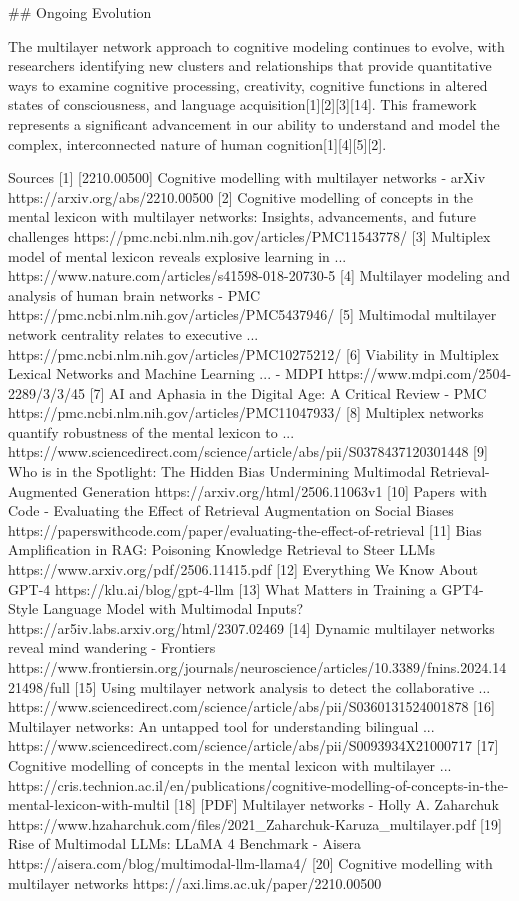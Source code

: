 {## Ongoing Evolution

The multilayer network approach to cognitive modeling continues to evolve, with researchers identifying new clusters and relationships that provide quantitative ways to examine cognitive processing, creativity, cognitive functions in altered states of consciousness, and language acquisition[1][2][3][14]. This framework represents a significant advancement in our ability to understand and model the complex, interconnected nature of human cognition[1][4][5][2].

Sources
[1] [2210.00500] Cognitive modelling with multilayer networks - arXiv https://arxiv.org/abs/2210.00500
[2] Cognitive modelling of concepts in the mental lexicon with multilayer networks: Insights, advancements, and future challenges https://pmc.ncbi.nlm.nih.gov/articles/PMC11543778/
[3] Multiplex model of mental lexicon reveals explosive learning in ... https://www.nature.com/articles/s41598-018-20730-5
[4] Multilayer modeling and analysis of human brain networks - PMC https://pmc.ncbi.nlm.nih.gov/articles/PMC5437946/
[5] Multimodal multilayer network centrality relates to executive ... https://pmc.ncbi.nlm.nih.gov/articles/PMC10275212/
[6] Viability in Multiplex Lexical Networks and Machine Learning ... - MDPI https://www.mdpi.com/2504-2289/3/3/45
[7] AI and Aphasia in the Digital Age: A Critical Review - PMC https://pmc.ncbi.nlm.nih.gov/articles/PMC11047933/
[8] Multiplex networks quantify robustness of the mental lexicon to ... https://www.sciencedirect.com/science/article/abs/pii/S0378437120301448
[9] Who is in the Spotlight: The Hidden Bias Undermining Multimodal Retrieval-Augmented Generation https://arxiv.org/html/2506.11063v1
[10] Papers with Code - Evaluating the Effect of Retrieval Augmentation on Social Biases https://paperswithcode.com/paper/evaluating-the-effect-of-retrieval
[11] Bias Amplification in RAG: Poisoning Knowledge Retrieval to Steer LLMs https://www.arxiv.org/pdf/2506.11415.pdf
[12] Everything We Know About GPT-4 https://klu.ai/blog/gpt-4-llm
[13] What Matters in Training a GPT4-Style Language Model with Multimodal Inputs? https://ar5iv.labs.arxiv.org/html/2307.02469
[14] Dynamic multilayer networks reveal mind wandering - Frontiers https://www.frontiersin.org/journals/neuroscience/articles/10.3389/fnins.2024.1421498/full
[15] Using multilayer network analysis to detect the collaborative ... https://www.sciencedirect.com/science/article/abs/pii/S0360131524001878
[16] Multilayer networks: An untapped tool for understanding bilingual ... https://www.sciencedirect.com/science/article/abs/pii/S0093934X21000717
[17] Cognitive modelling of concepts in the mental lexicon with multilayer ... https://cris.technion.ac.il/en/publications/cognitive-modelling-of-concepts-in-the-mental-lexicon-with-multil
[18] [PDF] Multilayer networks - Holly A. Zaharchuk https://www.hzaharchuk.com/files/2021_Zaharchuk-Karuza_multilayer.pdf
[19] Rise of Multimodal LLMs: LLaMA 4 Benchmark - Aisera https://aisera.com/blog/multimodal-llm-llama4/
[20] Cognitive modelling with multilayer networks https://axi.lims.ac.uk/paper/2210.00500

}
